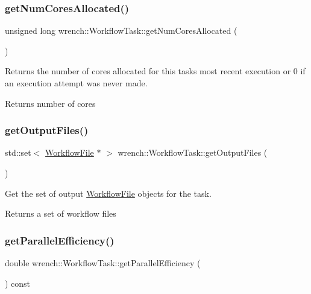 \subsubsection{\texorpdfstring{get\+Num\+Cores\+Allocated()}{getNumCoresAllocated()}}
{\footnotesize\ttfamily unsigned long wrench\+::\+Workflow\+Task\+::get\+Num\+Cores\+Allocated (\begin{DoxyParamCaption}{ }\end{DoxyParamCaption})}



Returns the number of cores allocated for this task\textquotesingle{}s most recent execution or 0 if an execution attempt was never made. 

\begin{DoxyReturn}{Returns}
number of cores 
\end{DoxyReturn}
\mbox{\label{classwrench_1_1_workflow_task_ade05bf520e4cda9a4d7aeaa8ffaa5855}} 
\subsubsection{\texorpdfstring{get\+Output\+Files()}{getOutputFiles()}}
{\footnotesize\ttfamily std\+::set$<$ \hyperlink{classwrench_1_1_workflow_file}{Workflow\+File} $\ast$ $>$ wrench\+::\+Workflow\+Task\+::get\+Output\+Files (\begin{DoxyParamCaption}{ }\end{DoxyParamCaption})}



Get the set of output \hyperlink{classwrench_1_1_workflow_file}{Workflow\+File} objects for the task. 

\begin{DoxyReturn}{Returns}
a set of workflow files 
\end{DoxyReturn}
\mbox{\label{classwrench_1_1_workflow_task_ab7e3113ba73aebc6e2776a6e56984662}} 
\subsubsection{\texorpdfstring{get\+Parallel\+Efficiency()}{getParallelEfficiency()}}
{\footnotesize\ttfamily double wrench\+::\+Workflow\+Task\+::get\+Parallel\+Efficiency (\begin{DoxyParamCaption}{ }\end{DoxyParamCaption}) const}



